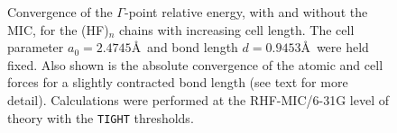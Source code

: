 \documentclass[prl,preprint,doublespace]{revtex4} %
\begin{document}
\begin{figure}[h]
  \caption{Convergence of the $\Gamma$-point relative energy, with and without the MIC,
    for the (HF)$_n$ chains with increasing cell length. The cell parameter 
    $a_0=2.4745$\AA~and bond length $d=0.9453$\AA~were held fixed. 
    Also shown is the absolute convergence of the atomic and cell forces for a slightly contracted 
    bond length (see text for more detail).
    Calculations were performed at the RHF-MIC/6-31G level of theory with 
    the {\tt TIGHT} thresholds.}\label{Fig:CnvgEnergy}
\end{figure}
\end{document}
